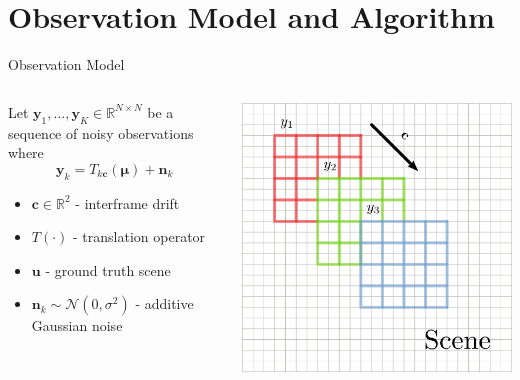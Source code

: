 \documentclass[10pt,xcolor=dvipsnames]{beamer}
\begin{document}


\section{Observation Model and Algorithm}

\begin{frame}{Observation Model}
  \begin{columns}
    \begin{column}{0.5 \textwidth}
      Let $\bm{y}_1, ..., \bm{y}_K \in \mathbb{R}^{N \times N}$ be a sequence of noisy observations where
      $$\bm{y}_k = T_{k\bm{c}}(\bm{\mu}) + \bm{n}_k$$
      \begin{itemize}
        \item $\bm{c} \in \mathbb{R}^2$ - interframe drift
        \item $T(\cdot)$ - translation operator
        \item $\bm{u}$ - ground truth scene
        \item $\bm{n}_k \sim \mathcal{N}(0, \sigma^2)$ - additive Gaussian noise
      \end{itemize}
    \end{column}
    \begin{column}{0.5 \textwidth}
      \includegraphics[width=\textwidth]{figures/obs_model.png}
    \end{column}
  \end{columns}

\end{frame}
\end{document}
